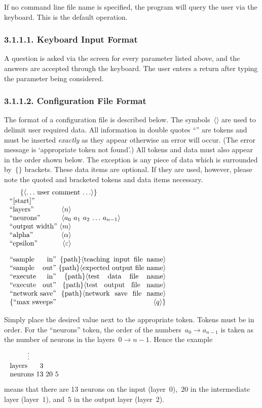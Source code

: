 \documentclass[12pt]{report}
\begin{document}
If no command line file name is specified, the program will query
the user via the keyboard.
This is the default operation.

\subsubsection{3.1.1.1. Keyboard Input Format}

A question is asked via the screen for every parameter listed above,
and the answers are accepted through the keyboard.
The user enters a return after typing the parameter being
considered.

\subsubsection{3.1.1.2. Configuration File Format}

The format of a configuration file is described below.
The symbols~$\langle\rangle$ are used to delimit user required data.
All information in double quotes ``'' are tokens and must be
inserted {\sl exactly} as they appear otherwise an error will occur.
(The error message is `appropriate token not found'.)
All tokens and data must also appear in the order shown below.
The exception is any piece of data which is surrounded
by~$\{\}$ brackets.
These data items are optional.
If they are used, however, please note the quoted and bracketed
tokens and data items necessary.
$$\vbox{
\halign{#&&\ #\cr
	\noalign{$\{\langle \ldots$ user comment $\ldots \rangle\}$}
	\noalign{}
	``[start]''\cr
	\noalign{}
	``layers''&$\langle n\rangle$\cr
	``neurons''&$\langle a_0$&$a_1$&$a_2$&$\ldots$&$a_{n-1}\rangle$\cr
	\noalign{}
	``output width''&$\langle m\rangle$\cr
	\noalign{}
	``alpha''&$\langle\alpha\rangle$\cr
	``epsilon''&$\langle\varepsilon\rangle$\cr
}}
$$
$$\vbox{
\halign{#&\ #\cr
	\noalign{$\quad$}
	``sample in''&$\{$path$\}\langle$teaching input file name$\rangle$\cr
	``sample out''&$\{$path$\}\langle$expected output file name$\rangle$\cr
	\noalign{}
	``execute in''&$\{$path$\}\langle$test data file name$\rangle$\cr
	``execute out''&$\{$path$\}\langle$test output file name$\rangle$\cr
	\noalign{}
	``network save''&$\{$path$\}\langle$network save file name$\rangle$\cr
	\noalign{}
	$\{$``max sweeps''&$\langle q\rangle\}$\cr
}}
$$

Simply place the desired value next to the appropriate token.
Tokens must be in order.
For the ``neurons'' token, the order of the numbers~$a_0\to a_{n-1}$ is 
taken as the number of neurons in the layers~$0\to n-1$.
Hence the example
$$\vbox{
\halign{#&&\ #\cr
	\noalign{$\quad\vdots$}
	layers&$3$\cr
	neurons&$13$&$20$&$5$\cr
}}
$$
means that there are 13 neurons on the input (layer~$0$),~$20$ in
the intermediate layer (layer~$1$), and~$5$ in the output layer
(layer~$2$).
\end{document}
